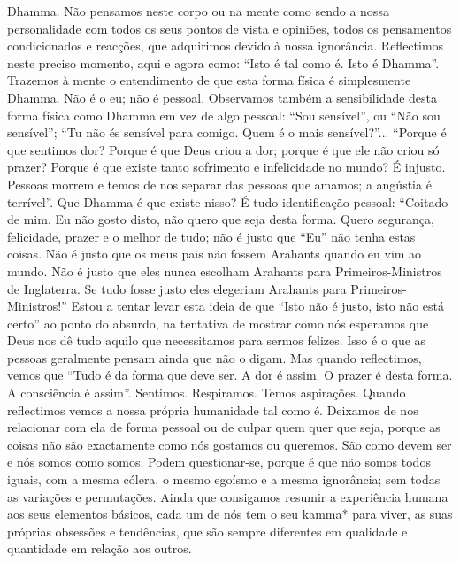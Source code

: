 Dhamma. Não pensamos neste corpo ou na mente como
sendo a nossa personalidade com todos os seus pontos de
vista e opiniões, todos os pensamentos condicionados e
reacções, que adquirimos devido à nossa ignorância.
Reflectimos neste preciso momento, aqui e agora como: “Isto
é tal como é. Isto é Dhamma”. Trazemos à mente o entendimento de que esta forma física é simplesmente Dhamma. Não é o
eu; não é pessoal.
Observamos também a sensibilidade desta forma física
como Dhamma em vez de algo pessoal: “Sou sensível”, ou
“Não sou sensível”; “Tu não és sensível para comigo. Quem
é o mais sensível?”... “Porque é que sentimos dor? Porque é
que Deus criou a dor; porque é que ele não criou só prazer?
Porque é que existe tanto sofrimento e infelicidade no
mundo? É injusto. Pessoas morrem e temos de nos separar
das pessoas que amamos; a angústia é terrível”.
Que Dhamma é que existe nisso? É tudo identificação
pessoal: “Coitado de mim. Eu não gosto disto, não quero que
seja desta forma. Quero segurança, felicidade, prazer e o melhor
de tudo; não é justo que “Eu” não tenha estas coisas. Não é
justo que os meus pais não fossem Arahants quando eu vim
ao mundo. Não é justo que eles nunca escolham Arahants
para Primeiros-Ministros de Inglaterra. Se tudo fosse justo
eles elegeriam Arahants para Primeiros-Ministros!”
Estou a tentar levar esta ideia de que “Isto não é justo,
isto não está certo” ao ponto do absurdo, na tentativa de
mostrar como nós esperamos que Deus nos dê tudo aquilo
que necessitamos para sermos felizes. Isso é o que as pessoas
geralmente pensam ainda que não o digam. Mas quando
reflectimos, vemos que “Tudo é da forma que deve ser. A dor
é assim. O prazer é desta forma. A consciência é assim”.
Sentimos. Respiramos. Temos aspirações.
Quando reflectimos vemos a nossa própria humanidade
tal como é. Deixamos de nos relacionar com ela de forma
pessoal ou de culpar quem quer que seja, porque as coisas não
são exactamente como nós gostamos ou queremos. São como
devem ser e nós somos como somos. Podem questionar-se,
porque é que não somos todos iguais, com a mesma cólera, o
mesmo egoísmo e a mesma ignorância; sem todas as variações e permutações. Ainda que consigamos resumir a experiência humana aos seus elementos básicos, cada um de nós tem
o seu kamma* para viver, as suas próprias obsessões e tendências, que são sempre diferentes em qualidade e quantidade em
relação aos outros.

